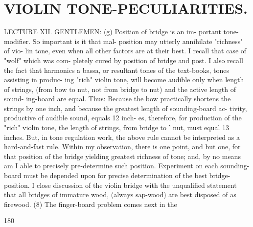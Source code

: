\documentclass{article}
\begin{document}
\section*{VIOLIN TONE-PECULIARITIES.}
LECTURE XII. GENTLEMEN: (g) Position of bridge is an im- portant tone-modifier. So important is it that mal- position may utterly annihilate "richness" of vio- lin tone, even when all other factors are at their best. I recall that case of "wolf" which was com- pletely cured by position of bridge and post. I also recall the fact that harmonics a bassa, or resultant tones of the text-books, tones assisting in produc- ing "rich" violin tone, will become audible only when length of strings, (from bow to nut, not from bridge to nut) and the active length of sound- ing-board are equal. Thus: Because the bow practically shortens the strings by one inch, and because the greatest length of sounding-board ac- tivity, productive of audible sound, equals 12 inch- es, therefore, for production of the "rich" violin tone, the length of strings, from bridge to ' nut, must equal 13 inches. But, in tone regulation work, the above rule cannot be interpreted as a hard-and-fast rule. Within my observation, there is one point, and but one, for that position of the bridge yielding greatest richness of tone; and, by no means am I able to precisely pre-determine such position. Experiment on each sounding-board must be depended upon for precise determination of the best bridge-position. I close discussion of the violin bridge with the unqualified statement that all bridges of immature wood, (always sap-wood) are best disposed of as firewood. (8) The finger-board problem comes next in the

180
\end{document}
